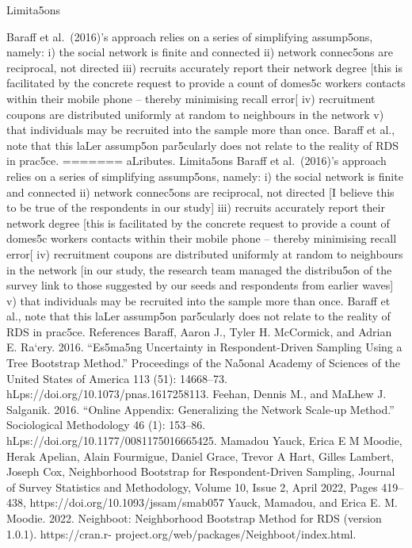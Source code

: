 \documentclass[
  12pt,
  letterpaper,
  DIV=11,
  numbers=noendperiod]{scrartcl}
\theoremstyle{plain}
\theoremstyle{definition}
\begin{document}
{Limita5ons

Baraﬀ et al.~(2016)'s approach relies on a series of simplifying
assump5ons, namely: i) the social network is finite and connected ii)
network connec5ons are reciprocal, not directed iii) recruits accurately
report their network degree {[}this is facilitated by the concrete
request to provide a count of domes5c workers contacts within their
mobile phone -- thereby minimising recall error{[} iv) recruitment
coupons are distributed uniformly at random to neighbours in the network
v) that individuals may be recruited into the sample more than once.
Baraﬀ et al., note that this laLer assump5on par5cularly does not relate
to the reality of RDS in prac5ce.
=======
aLributes. Limita5ons Baraﬀ et al.~(2016)'s approach relies on a series
of simplifying assump5ons, namely: i) the social network is finite and
connected ii) network connec5ons are reciprocal, not directed {[}I
believe this to be true of the respondents in our study{]} iii) recruits
accurately report their network degree {[}this is facilitated by the
concrete request to provide a count of domes5c workers contacts within
their mobile phone -- thereby minimising recall error{[} iv) recruitment
coupons are distributed uniformly at random to neighbours in the network
{[}in our study, the research team managed the distribu5on of the survey
link to those suggested by our seeds and respondents from earlier
waves{]} v) that individuals may be recruited into the sample more than
once. Baraﬀ et al., note that this laLer assump5on par5cularly does not
relate to the reality of RDS in prac5ce. References Baraﬀ, Aaron J.,
Tyler H. McCormick, and Adrian E. Ra`ery. 2016. ``Es5ma5ng Uncertainty
in Respondent-Driven Sampling Using a Tree Bootstrap Method.''
Proceedings of the Na5onal Academy of Sciences of the United States of
America 113 (51): 14668--73. hLps://doi.org/10.1073/pnas.1617258113.
Feehan, Dennis M., and MaLhew J. Salganik. 2016. ``Online Appendix:
Generalizing the Network Scale-up Method.'' Sociological Methodology 46
(1): 153--86. hLps://doi.org/10.1177/0081175016665425. Mamadou Yauck,
Erica E M Moodie, Herak Apelian, Alain Fourmigue, Daniel Grace, Trevor A
Hart, Gilles Lambert, Joseph Cox, Neighborhood Bootstrap for
Respondent-Driven Sampling, Journal of Survey Statistics and
Methodology, Volume 10, Issue 2, April 2022, Pages 419--438,
https://doi.org/10.1093/jssam/smab057 Yauck, Mamadou, and Erica E. M.
Moodie. 2022. Neighboot: Neighborhood Bootstrap Method for RDS (version
1.0.1). https://cran.r- project.org/web/packages/Neighboot/index.html.

}
\end{document}

